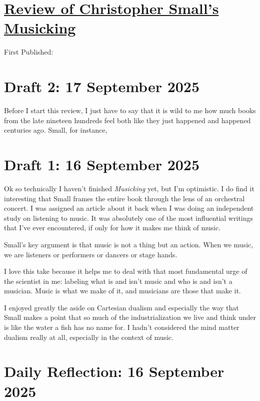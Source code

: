 \documentclass[12pt]{article}
\renewcommand{\,}{\textsuperscript{,}}
\begin{document}
  
\doublespacing  
\section{\href{review-musicking.html}{Review of Christopher Small's Musicking}}  
First Published: 

\section{Draft 2: 17 September 2025}
Before I start this review, I just have to say that it is wild to me how much books from the late nineteen hundreds feel both like they just happened and happened centuries ago.
Small, for instance, 

\section{Draft 1: 16 September 2025}
Ok so technically I haven't finished \textit{Musicking} yet, but I'm optimistic.
I do find it interesting that Small frames the entire book through the lens of an orchestral concert.
I was assigned an article about it back when I was doing an independent study on listening to music.
It was absolutely one of the most influential writings that I've ever encountered, if only for how it makes me think of music.

Small's key argument is that music is not a thing but an action.
When we music, we are listeners or performers or dancers or stage hands.

I love this take because it helps me to deal with that most fundamental urge of the scientist in me: labeling what is and isn't music and who is and isn't a musician.
Music is what we make of it, and musicians are those that make it.

I enjoyed greatly the aside on Cartesian dualism and especially the way that Small makes a point that so much of the industrialization we live and think under is like the water a fish has no name for.
I hadn't considered the mind matter dualism really at all, especially in the context of music.



\section{Daily Reflection: 16 September 2025}
\end{document}
